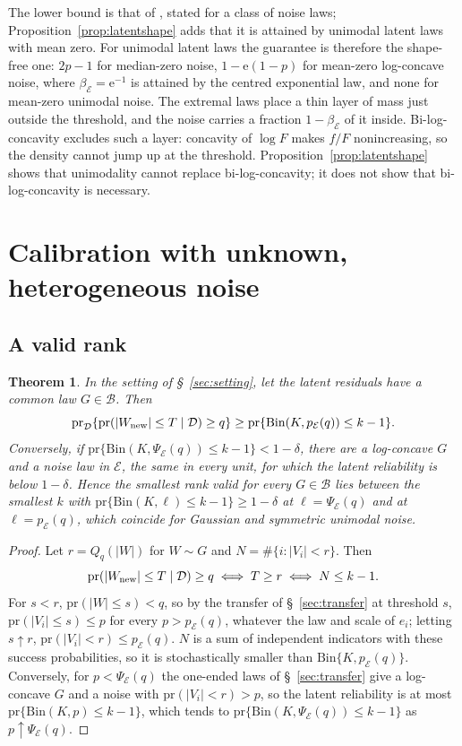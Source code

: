 \documentclass[12pt]{article}
\newtheorem{theorem}{Theorem}
\theoremstyle{definition}
\newcommand{\pr}{\mathrm{pr}}
\newcommand{\B}{\mathcal{B}}
\newcommand{\E}{\mathcal{E}}
\newcommand{\Bin}{\mathrm{Bin}}
\begin{document}
The lower bound is that of \citet[Proposition~2.3]{guille2024}, stated for a class of noise laws; Proposition~\ref{prop:latentshape} adds that it is attained by unimodal latent laws with mean zero. For unimodal latent laws the guarantee is therefore the shape-free one: $2p - 1$ for median-zero noise, $1 - \mathrm{e}(1 - p)$ for mean-zero log-concave noise, where $\beta_{\E} = \mathrm{e}^{-1}$ is attained by the centred exponential law, and none for mean-zero unimodal noise. The extremal laws place a thin layer of mass just outside the threshold, and the noise carries a fraction $1 - \beta_{\E}$ of it inside. Bi-log-concavity excludes such a layer: concavity of $\log F$ makes $f/F$ nonincreasing, so the density cannot jump up at the threshold. Proposition~\ref{prop:latentshape} shows that unimodality cannot replace bi-log-concavity; it does not show that bi-log-concavity is necessary.

\section{Calibration with unknown, heterogeneous noise}\label{sec:procedure}

\subsection{A valid rank}

\begin{theorem}\label{thm:rank}
In the setting of \S~\ref{sec:setting}, let the latent residuals have a common law $G \in \B$. Then
\[
\pr_{\mathcal D}\{\pr(|W_{\rm new}| \le T \mid \mathcal D) \ge q\} \ge \pr\{\Bin(K, p_{\E}(q)) \le k - 1\}.
\]
Conversely, if $\pr\{\Bin(K, \Psi_{\E}(q)) \le k - 1\} < 1 - \delta$, there are a log-concave $G$ and a noise law in $\E$, the same in every unit, for which the latent reliability is below $1 - \delta$. Hence the smallest rank valid for every $G \in \B$ lies between the smallest $k$ with $\pr\{\Bin(K, \ell) \le k - 1\} \ge 1 - \delta$ at $\ell = \Psi_{\E}(q)$ and at $\ell = p_{\E}(q)$, which coincide for Gaussian and symmetric unimodal noise.
\end{theorem}

\begin{proof}
Let $r = Q_q(|W|)$ for $W \sim G$ and $N = \#\{i : |V_i| < r\}$. Then
\[
\pr(|W_{\rm new}| \le T \mid \mathcal D) \ge q \iff T \ge r \iff N \le k - 1.
\]
For $s < r$, $\pr(|W| \le s) < q$, so by the transfer of \S~\ref{sec:transfer} at threshold $s$, $\pr(|V_i| \le s) \le p$ for every $p > p_{\E}(q)$, whatever the law and scale of $e_i$; letting $s \uparrow r$, $\pr(|V_i| < r) \le p_{\E}(q)$. $N$ is a sum of independent indicators with these success probabilities, so it is stochastically smaller than $\Bin\{K, p_{\E}(q)\}$. Conversely, for $p < \Psi_{\E}(q)$ the one-ended laws of \S~\ref{sec:transfer} give a log-concave $G$ and a noise with $\pr(|V_i| < r) > p$, so the latent reliability is at most $\pr\{\Bin(K, p) \le k - 1\}$, which tends to $\pr\{\Bin(K, \Psi_{\E}(q)) \le k - 1\}$ as $p \uparrow \Psi_{\E}(q)$.
\end{proof}
\end{document}
